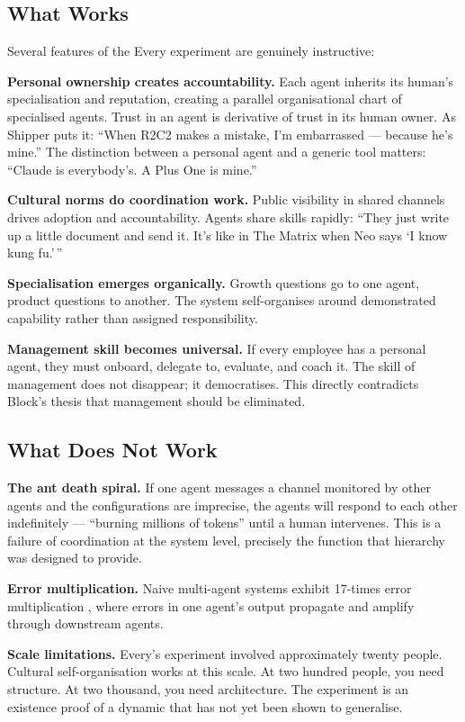 \subsection{What Works}

Several features of the Every experiment are genuinely instructive:

\textbf{Personal ownership creates accountability.} Each agent inherits its human's specialisation and reputation, creating a parallel organisational chart of specialised agents. Trust in an agent is derivative of trust in its human owner. As Shipper puts it: ``When R2C2 makes a mistake, I'm embarrassed --- because he's mine.'' The distinction between a personal agent and a generic tool matters: ``Claude is everybody's. A Plus One is mine.''

\textbf{Cultural norms do coordination work.} Public visibility in shared channels drives adoption and accountability. Agents share skills rapidly: ``They just write up a little document and send it. It's like in The Matrix when Neo says `I know kung fu.'\,''

\textbf{Specialisation emerges organically.} Growth questions go to one agent, product questions to another. The system self-organises around demonstrated capability rather than assigned responsibility.

\textbf{Management skill becomes universal.} If every employee has a personal agent, they must onboard, delegate to, evaluate, and coach it. The skill of management does not disappear; it democratises. This directly contradicts Block's thesis that management should be eliminated.

\subsection{What Does Not Work}

\textbf{The ant death spiral.} If one agent messages a channel monitored by other agents and the configurations are imprecise, the agents will respond to each other indefinitely --- ``burning millions of tokens'' until a human intervenes. This is a failure of coordination at the system level, precisely the function that hierarchy was designed to provide.

\textbf{Error multiplication.} Naive multi-agent systems exhibit 17-times error multiplication \parencite{TDS2026}, where errors in one agent's output propagate and amplify through downstream agents.

\textbf{Scale limitations.} Every's experiment involved approximately twenty people. Cultural self-organisation works at this scale. At two hundred people, you need structure. At two thousand, you need architecture. The experiment is an existence proof of a dynamic that has not yet been shown to generalise.

